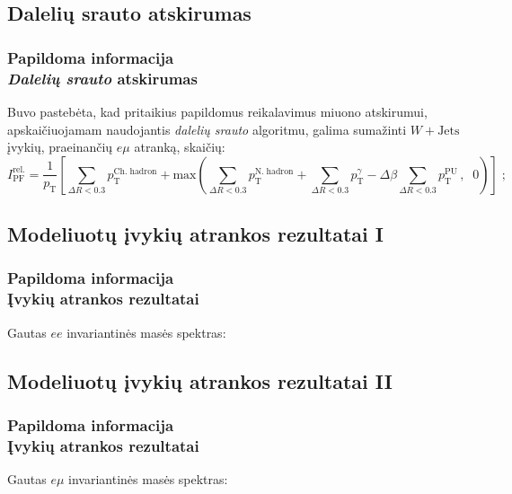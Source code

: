 \documentclass[xcolor=dvipsnames]{beamer}
\newcommand{\pT}{\mathit{p}_{\mathrm{T}}}
\newcommand{\WJets}{\mathit{W}+\mathrm{Jets}}
\newcommand{\emu}{\mathit{e}\mu}
\newcommand{\ee}{\mathit{ee}}
\begin{document}
\begin{frame}
\subsection{Dalelių srauto atskirumas}
\frametitle{Papildoma informacija\\ \normalsize \textit{Dalelių srauto} atskirumas}
Buvo pastebėta, kad pritaikius papildomus reikalavimus miuono atskirumui, apskaičiuojamam naudojantis \textit{dalelių srauto} algoritmu, galima sumažinti $\WJets$ įvykių, praeinančių $\emu$ atranką, skaičių:
\tiny
\begin{equation*}
\mathit{I}^{\mathrm{rel.}}_{\mathrm{PF}}= \frac{1}{\pT} 
\left[ \sum_{\Delta \mathit{R}<0.3} \pT^{\mathrm{Ch.\;hadron}}+\mathrm{max}
\left( \sum_{\Delta \mathit{R}<0.3} \pT^{\mathrm{N.\;hadron}}+\sum_{\Delta \mathit{R}<0.3} \pT^{\gamma}-\Delta \beta \sum_{\Delta \mathit{R}<0.3} \pT^{\mathrm{PU}} \, ,\;\; 0 \right) \right] \; \mathrm{;}
\end{equation*}

\end{frame}

\begin{frame}
\subsection{Modeliuotų įvykių atrankos rezultatai I}
\frametitle{Papildoma informacija\\ \small Įvykių atrankos rezultatai}
Gautas $\ee$ invariantinės masės spektras:\\
\centering
\vspace{0.3cm}
\end{frame}

\begin{frame}
\subsection{Modeliuotų įvykių atrankos rezultatai II}
\frametitle{Papildoma informacija\\ \small Įvykių atrankos rezultatai}
Gautas $\emu$ invariantinės masės spektras:\\
\centering
\vspace{0.3cm}
\end{frame}
\end{document}
